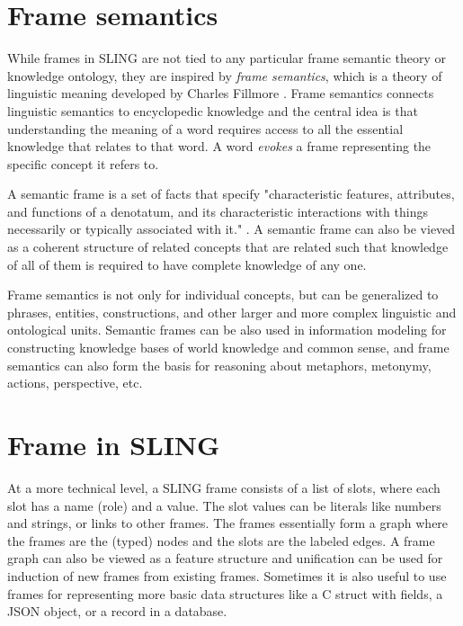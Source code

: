 \documentclass[11pt,a4paper]{article}
\begin{document}
\section{Frame semantics}
\label{sec:framesem}

While frames in SLING are not tied to any particular frame semantic theory or
knowledge ontology, they are inspired by \emph{frame semantics}, which is a
theory of linguistic meaning developed by Charles Fillmore \cite{fillmore1982}.
Frame semantics connects linguistic semantics to encyclopedic knowledge and the
central idea is that understanding the meaning of a word requires access to all
the essential knowledge that relates to that word. A word \emph{evokes} a frame
representing the specific concept it refers to.

A semantic frame is a set of facts that specify "characteristic
features, attributes, and functions of a denotatum, and its characteristic
interactions with things necessarily or typically associated with it." \cite{alan2001}.
A semantic frame can also be vieved as a coherent structure of related concepts
that are related such that knowledge of all of them is required to have
complete knowledge of any one.

Frame semantics is not only for individual concepts, but can be generalized
to phrases, entities, constructions, and other larger and more complex linguistic
and ontological units. Semantic frames can be also used in information modeling
for constructing knowledge bases of world knowledge and common sense, and frame
semantics can also form the basis for reasoning about metaphors, metonymy,
actions, perspective, etc.

\section{Frame in SLING}
\label{sec:slingframes}

At a more technical level, a SLING frame consists of a list of slots, where each
slot has a name (role) and a value. The slot values can be literals like numbers
and strings, or links to other frames. The frames essentially form a graph where
the frames are the (typed) nodes and the slots are the labeled edges. A frame
graph can also be viewed as a feature structure \cite{carpenter2005} and
unification can be used for induction of new frames from existing frames.
Sometimes it is also useful to use frames for representing more basic data
structures like a C struct with fields, a JSON object, or a record in a
database.
\end{document}
